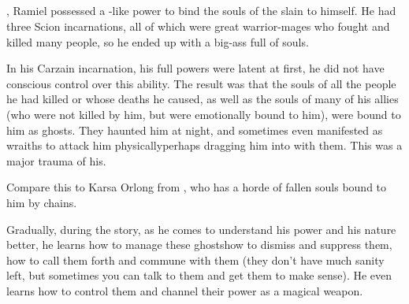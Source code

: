 






\subsection{\Carcer}
, Ramiel possessed a \sephirah-like power to bind the souls of the slain to himself. 
He had three Scion incarnations, all of which were great warrior-mages who fought and killed many people, so he ended up with a big-ass \carcer{} full of souls. 

In his Carzain incarnation, his full \Malach{} powers were latent at first, he did not have conscious control over this ability. 
The result was that the souls of all the people he had killed or whose deaths he caused, as well as the souls of many of his allies (who were not killed by him, but were emotionally bound to him), were bound to him as ghosts. 
They haunted him at night, and sometimes even manifested as wraiths to attack him physically\dash perhaps dragging him into \Nyx{} with them. 
This was a major trauma of his. 

Compare this to Karsa Orlong from \cite{StevenEriksonIanCameronEsslemont:MalazanBookoftheFallen}, who has a horde of fallen souls bound to him by chains.

Gradually, during the story, as he comes to understand his power and his nature better, he learns how to manage these ghosts\dash how to dismiss and suppress them, how to call them forth and commune with them (they don't have much sanity left, but sometimes you can talk to them and get them to make sense). 
He even learns how to control them and channel their power as a magical weapon. 



